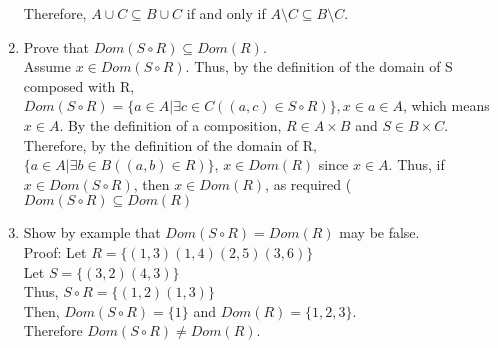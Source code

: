 \documentclass[10pt,a4paper]{article}
\begin{document}
\begin{enumerate}
Therefore, $A \cup C \subseteq B \cup C$ if and only if $A \setminus C \subseteq B \setminus C$.\\
\item Prove that $Dom(S \circ R) \subseteq Dom(R)$.\\
Assume $x \in Dom(S \circ R)$. Thus, by the definition of the domain of  S composed with R, $Dom(S \circ R)= \{a \in A | \exists c \in C ((a,c) \in S \circ R) \}, x \in a \in A$, which means $ x \in A$. By the definition of a composition, $R \in A \times B$ and $S \in B \times C$. Therefore,  by the definition of the domain of R, $\{a\in A | \exists b \in B ((a,b) \in R) \}$, $x \in Dom(R)$ since $x \in A$.  Thus, if $x \in Dom(S \circ R)$, then $x \in Dom(R)$, as required ($Dom(S \circ R) \subseteq Dom(R)$
\item Show by example that $Dom(S \circ R) = Dom(R)$ may be false.\\
Proof: Let $R= \{(1,3)(1,4)(2,5)(3,6)\}$ \\
Let $S=\{(3,2)(4,3)\}$\\
Thus, $S \circ R= \{(1,2)(1,3)\}$\\
Then, $Dom(S\circ R)= \{1\}$
and $Dom(R) = \{1,2,3\}$.\\
 Therefore $Dom(S \circ R) \not = Dom(R)$.
\end{enumerate}
\end{document}
